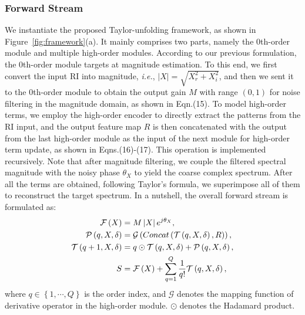 \documentclass{article}
\begin{document}
\subsubsection{Forward Stream}
\label{forward-stream}
We instantiate the proposed Taylor-unfolding framework, as shown in Figure~{\ref{fig:framework}}(a). It mainly comprises two parts, namely the 0th-order module and multiple high-order modules. According to our previous formulation, the 0th-order module targets at magnitude estimation. To this end, we first convert the input RI into magnitude, \emph{i.e.}, $\lvert X\rvert = \sqrt{X_{r}^{2} + X_{i}^{2}}$, and then we sent it to the 0th-order module to obtain the output gain $M$ with range $\left(0, 1\right)$ for noise filtering in the magnitude domain, as shown in Eqn.{(15)}. To model high-order terms, we employ the high-order encoder to directly extract the patterns from the RI input, and the output feature map $R$ is then concatenated with the output from the last high-order module as the input of the next module for high-order term update, as shown in Eqns.(16)-(17). This operation is implemented recursively. Note that after magnitude filtering, we couple the filtered spectral magnitude with the noisy phase $\theta_{X}$ to yield the coarse complex spectrum. After all the terms are obtained, following Taylor's formula, we superimpose all of them to reconstruct the target spectrum. In a nutshell, the overall forward stream is formulated as:
\begin{align}
\mathcal{F}\left(X\right) &= M\left| X \right|e^{j\theta_{X}},\\
\mathcal{P}\left(q, X, \delta\right) &= \mathcal{G}\left(Concat\left(\mathcal{T}\left(q, X,\delta\right), R\right)\right), \\
\mathcal{T}\left(q + 1, X, \delta\right) &= q \odot\mathcal{T}\left(q, X, \delta\right) + \mathcal{P}\left(q, X, \delta\right), \\
S &= \mathcal{F}\left(X\right) + \sum_{q=1}^{Q}\frac{1}{q!}\mathcal{T}\left(q, X, \delta\right),
\vspace{-0.2cm}
\end{align}
where $q\in\left\{1,\cdots,Q\right\}$ is the order index, and $\mathcal{G}$ denotes the mapping function of derivative operator in the high-order module. $\odot$ denotes the Hadamard product.
\vspace{-0.05cm}
\end{document}
